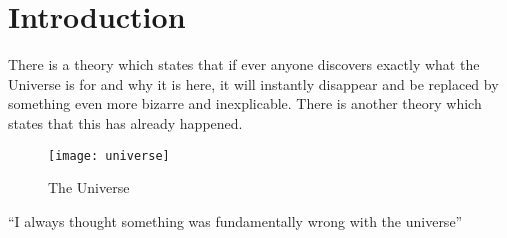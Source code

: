 \chapter{Introduction}\label{cap:introduction} 

There is a theory which states that if ever anyone discovers exactly what the Universe is for and why it is here, it will instantly disappear and be replaced by something even more bizarre and inexplicable.
There is another theory which states that this has already happened.

\begin{figure}[h!]
    \centering
    \texttt{[image: universe]}
    \caption{The Universe}
    \label{fig:universe}
\end{figure}

``I always thought something was fundamentally wrong with the universe'' \cite{Zienkiewicz1}

\lipsum

\ifchapterbib
    
\fi



